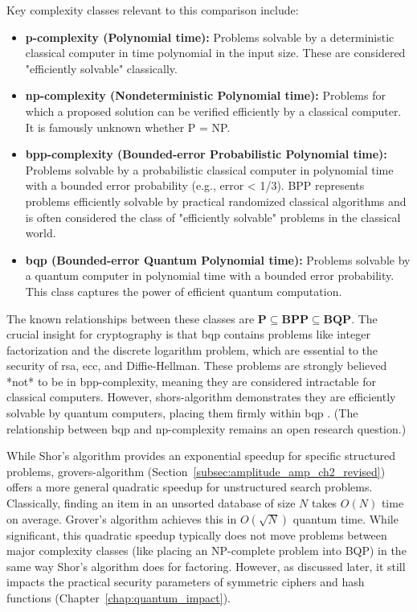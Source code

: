 Key complexity classes relevant to this comparison include:
\begin{itemize}
    \item \textbf{\Gls{p-complexity} (Polynomial time):} Problems solvable by a deterministic classical computer in time polynomial in the input size. These are considered "efficiently solvable" classically.
    \item \textbf{\Gls{np-complexity} (Nondeterministic Polynomial time):} Problems for which a proposed solution can be verified efficiently by a classical computer. It is famously unknown whether P = NP.
    \item \textbf{\Gls{bpp-complexity} (Bounded-error Probabilistic Polynomial time):} Problems solvable by a probabilistic classical computer in polynomial time with a bounded error probability (e.g., error < 1/3). BPP represents problems efficiently solvable by practical randomized classical algorithms and is often considered the class of "efficiently solvable" problems in the classical world.
    \item \textbf{\Gls{bqp} (Bounded-error Quantum Polynomial time):} Problems solvable by a quantum computer in polynomial time with a bounded error probability. This class captures the power of efficient quantum computation.
\end{itemize}
\parencite{arora_barak_complexity}

The known relationships between these classes are $\textbf{P} \subseteq \textbf{BPP} \subseteq \textbf{BQP}$. The crucial insight for cryptography is that \gls{bqp} contains problems like integer factorization and the discrete logarithm problem, which are essential to the security of \gls{rsa}, \gls{ecc}, and Diffie-Hellman. These problems are strongly believed *not* to be in \gls{bpp-complexity}, meaning they are considered intractable for classical computers. However, \gls{shors-algorithm} demonstrates they are efficiently solvable by quantum computers, placing them firmly within \gls{bqp} \parencite{shor1997polynomial}. (The relationship between \gls{bqp} and \gls{np-complexity} remains an open research question.)

While Shor's algorithm provides an exponential speedup for specific structured problems, \Gls{grovers-algorithm} (Section~\ref{subsec:amplitude_amp_ch2_revised}) offers a more general quadratic speedup for unstructured search problems. Classically, finding an item in an unsorted database of size $N$ takes $O(N)$ time on average. Grover's algorithm achieves this in $O(\sqrt{N})$ quantum time. While significant, this quadratic speedup typically does not move problems between major complexity classes (like placing an NP-complete problem into BQP) in the same way Shor's algorithm does for factoring. However, as discussed later, it still impacts the practical security parameters of symmetric ciphers and hash functions (Chapter~\ref{chap:quantum_impact}).

